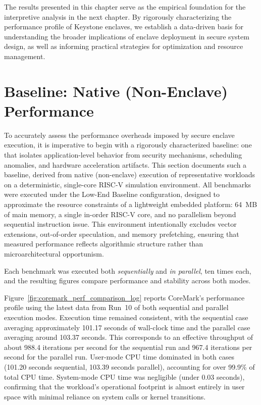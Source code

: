 The results presented in this chapter serve as the empirical foundation for the interpretive analysis in the next chapter. By rigorously characterizing the performance profile of Keystone enclaves, we establish a data-driven basis for understanding the broader implications of enclave deployment in secure system design, as well as informing practical strategies for optimization and resource management.

\section{Baseline: Native (Non-Enclave) Performance}
\label{sec:baseline-native}

To accurately assess the performance overheads imposed by secure enclave execution, it is imperative to begin with a rigorously characterized baseline: one that isolates application-level behavior from security mechanisms, scheduling anomalies, and hardware acceleration artifacts. This section documents such a baseline, derived from native (non-enclave) execution of representative workloads on a deterministic, single-core RISC-V simulation environment. All benchmarks were executed under the Low-End Baseline configuration, designed to approximate the resource constraints of a lightweight embedded platform: 64~MB of main memory, a single in-order RISC-V core, and no parallelism beyond sequential instruction issue. This environment intentionally excludes vector extensions, out-of-order speculation, and memory prefetching, ensuring that measured performance reflects algorithmic structure rather than microarchitectural opportunism.

Each benchmark was executed both \emph{sequentially} and \emph{in parallel}, ten times each, and the resulting figures compare performance and stability across both modes.

Figure~\ref{fig:coremark_perf_comparison_log} reports CoreMark's performance profile using the latest data from Run~10 of both sequential and parallel execution modes. Execution time remained consistent, with the sequential case averaging approximately 101.17 seconds of wall-clock time and the parallel case averaging around 103.37 seconds. This corresponds to an effective throughput of about 988.4 iterations per second for the sequential run and 967.4 iterations per second for the parallel run. User-mode CPU time dominated in both cases (101.20 seconds sequential, 103.39 seconds parallel), accounting for over 99.9\% of total CPU time. System-mode CPU time was negligible (under 0.03 seconds), confirming that the workload’s operational footprint is almost entirely in user space with minimal reliance on system calls or kernel transitions.

